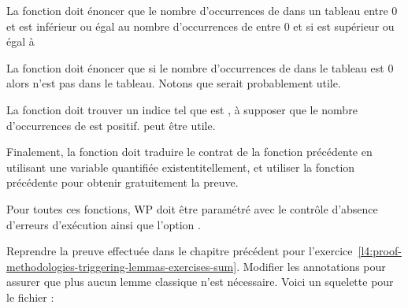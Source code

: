 La fonction  doit énoncer que le nombre d'occurrences
de  dans un tableau entre 0 et  est inférieur
ou égal au nombre d'occurrences de  entre 0 et  si
 est supérieur ou égal à 


La fonction  doit énoncer que si le nombre
d'occurrences de  dans le tableau est 0 alors  n'est
pas dans le tableau. Notons que  serait probablement
utile.


La fonction  doit trouver un indice 
tel que  est , à supposer que le nombre
d'occurrences de  est positif.  peut
être utile.


Finalement, la fonction  doit traduire le contrat
de la fonction précédente en utilisant une variable quantifiée existentitellement,
et utiliser la fonction précédente pour obtenir gratuitement la preuve.


Pour toutes ces fonctions, WP doit être paramétré avec le contrôle d'absence
d'erreurs d'exécution ainsi que l'option .




Reprendre la preuve effectuée dans le chapitre précédent pour
l'exercice~\ref{l4:proof-methodologies-triggering-lemmas-exercises-sum}. Modifier
les annotations pour assurer que plus aucun lemme classique n'est nécessaire.
Voici un squelette pour le fichier :



